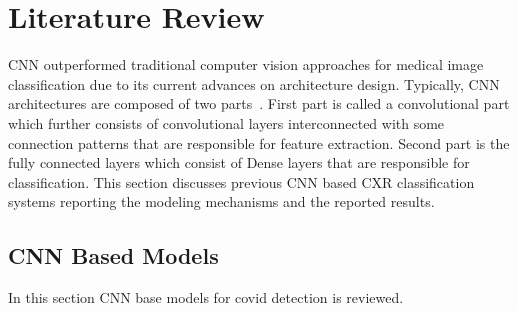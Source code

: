 
\chapter{Literature Review} %

\label{chp:related} %

CNN outperformed traditional computer vision approaches for medical image classification due to its current advances on architecture design. Typically, CNN architectures are composed of two parts~\cite{krizhevsky2012imagenet}. First part is called a convolutional part which further consists of  convolutional layers interconnected with some connection patterns that are responsible for feature extraction. Second part is the fully connected layers which consist of Dense layers that are responsible for classification. This section discusses previous CNN based CXR classification systems  reporting the modeling mechanisms and the reported results.
\section{CNN Based Models}
In this section CNN base models for covid detection is reviewed.
